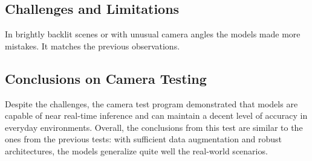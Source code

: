 \documentclass{article}
\begin{document}
\subsection{Challenges and Limitations}
In brightly backlit scenes or with unusual camera angles the models made more mistakes. It matches the previous observations.

\subsection{Conclusions on Camera Testing}
Despite the challenges, the camera test program demonstrated that models are capable of near real-time inference and can maintain a decent level of accuracy in everyday environments. Overall, the conclusions from this test are similar to the ones from the previous tests: with sufficient data augmentation and robust architectures, the models generalize quite well the real-world scenarios.
\end{document}

